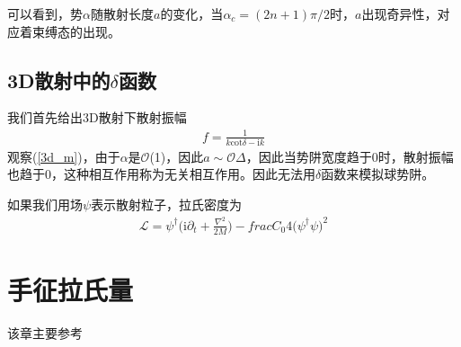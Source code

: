 \documentclass[aps,tightenlines,16pt]{ctexart}
\numberwithin{equation}{section}
\newcommand{\mO}{\mathcal{O}}
\newcommand{\mL}{\mathcal{L}}
\begin{document}
可以看到，势$\alpha$随散射长度$a$的变化，当$\alpha_c=(2n+1)\pi/2$时，$a$出现奇异性，对应着束缚态的出现。

\subsection{3D散射中的$\delta$函数}

我们首先给出3D散射下散射振幅
\begin{align}
   f=\frac{1}{k\mbox{cot}\delta-\mbox{i}k}
\end{align}
观察(\ref{3d_m})，由于$\alpha$是$\mO$(1)，因此$a\sim\mO{\Delta}$，因此当势阱宽度趋于0时，散射振幅也趋于0，这种相互作用称为无关相互作用。因此无法用$\delta$函数来模拟球势阱。

如果我们用场$\psi$表示散射粒子，拉氏密度为
\begin{align}
   \mL = \psi^{\dagger}\Big(\mbox{i}\partial_t+\frac{\nabla^2}{2M}\Big)-frac{C_0}{4}\Big(\psi^{\dagger}\psi\Big)^2
\end{align}


\section{手征拉氏量}
该章主要参考\cite{scherer2011primer}





    
\newpage 

\renewcommand\refname{参考文献}




\end{document}
